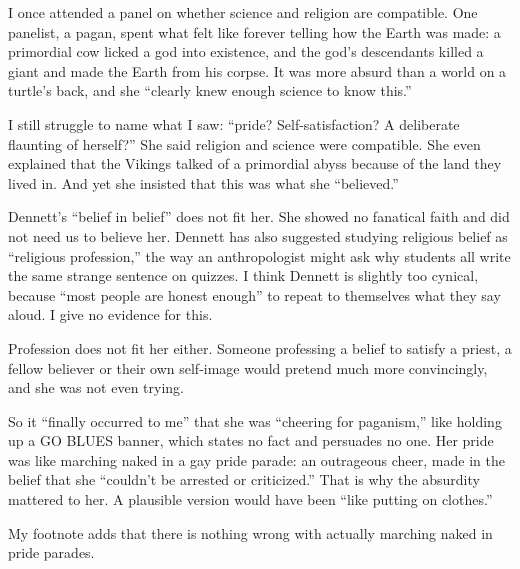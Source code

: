 
I once attended a panel on whether science and religion are compatible. One panelist, a pagan, spent what felt like forever telling how the Earth was made: a primordial cow licked a god into existence, and the god's descendants killed a giant and made the Earth from his corpse.  It was more absurd than a world on a turtle's back, and she ``clearly knew enough science to know this.''

I still struggle to name what I saw: ``pride? Self-satisfaction? A deliberate flaunting of herself?'' She said religion and science were compatible. She even explained that the Vikings talked of a primordial abyss because of the land they lived in. And yet she insisted that this was what she ``believed.'' 

Dennett's ``belief in belief'' does not fit her. She showed no fanatical faith and did not need us to believe her. Dennett has also suggested studying religious belief as ``religious profession,'' the way an anthropologist might ask why students all write the same strange sentence on quizzes.  I think Dennett is slightly too cynical, because ``most people are honest enough'' to repeat to themselves what they say aloud. I give no evidence for this.

Profession does not fit her either. Someone professing a belief to satisfy a priest, a fellow believer or their own self-image would pretend much more convincingly, and she was not even trying.

So it ``finally occurred to me'' that she was ``cheering for paganism,'' like holding up a GO BLUES banner, which states no fact and persuades no one. Her pride was like marching naked in a gay pride parade: an outrageous cheer, made in the belief that she ``couldn't be arrested or criticized.'' That is why the absurdity mattered to her. A plausible version would have been ``like putting on clothes.'' 

My footnote adds that there is nothing wrong with actually marching naked in pride parades.

